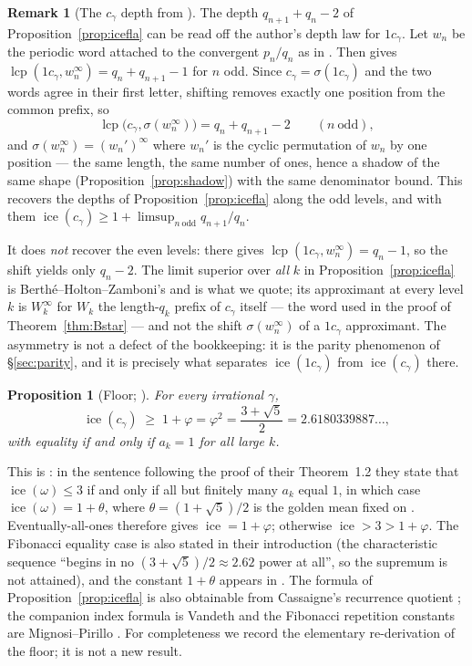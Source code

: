 \documentclass[11pt,reqno]{amsart}
\theoremstyle{plain}
\newtheorem{proposition}[theorem]{Proposition}
\theoremstyle{definition}
\newtheorem{remark}[theorem]{Remark}
\DeclareMathOperator{\lcp}{lcp}
\DeclareMathOperator{\ice}{ice}
\begin{document}
\begin{remark}[The $c_\gamma$ depth from {\cite[Theorem 8.3]{DJirr}}]\label{rem:depthfromP1}
The depth $q_{n+1}+q_n-2$ of Proposition~\ref{prop:icefla} can be read off the author's depth law
for $1c_\gamma$. Let $w_n$ be the periodic word attached to the convergent $p_n/q_n$ as in
\cite[\S8]{DJirr}. Then \cite[Theorem 8.3]{DJirr} gives
$\lcp(1c_\gamma,w_n^{\infty})=q_n+q_{n+1}-1$ for $n$ odd. Since $c_\gamma=\sigma(1c_\gamma)$
and the two words agree in their first letter, shifting removes exactly one position from the common
prefix, so
\[
  \lcp\bigl(c_\gamma,\sigma(w_n^{\infty})\bigr)=q_n+q_{n+1}-2
  \qquad(n\ \text{odd}),
\]
and $\sigma(w_n^{\infty})=(w_n')^{\infty}$ where $w_n'$ is the cyclic permutation of $w_n$ by one
position --- the same length, the same number of ones, hence a shadow of the same shape
(Proposition~\ref{prop:shadow}) with the same denominator bound. This recovers the depths of
Proposition~\ref{prop:icefla} along the odd levels, and with them
$\ice(c_\gamma)\ge1+\limsup_{n\ \mathrm{odd}}q_{n+1}/q_n$.

It does \emph{not} recover the even levels: there \cite[Theorem 8.3]{DJirr} gives
$\lcp(1c_\gamma,w_n^{\infty})=q_n-1$, so the shift yields only $q_n-2$. The limit superior over
\emph{all} $k$ in Proposition~\ref{prop:icefla} is Berth\'e--Holton--Zamboni's and is what we
quote; its approximant at every level $k$ is $W_k^{\infty}$ for $W_k$ the length-$q_k$ prefix of
$c_\gamma$ itself --- the word used in the proof of Theorem~\ref{thm:Bstar} --- and not the shift
$\sigma(w_n^{\infty})$ of a $1c_\gamma$ approximant. The asymmetry is not a defect of the
bookkeeping: it is the parity phenomenon of \S\ref{sec:parity}, and it is precisely what separates
$\ice(1c_\gamma)$ from $\ice(c_\gamma)$ there.
\end{remark}

\begin{proposition}[{Floor; \cite[\S4.2]{BHZ06}}]\label{prop:icefloor}
For every irrational $\gamma$,
\[
  \ice(c_\gamma)\;\ge\;1+\varphi=\varphi^{2}=\frac{3+\sqrt5}{2}=2.6180339887\ldots,
\]
with equality if and only if $a_k=1$ for all large $k$.
\end{proposition}

This is \cite[\S4.2]{BHZ06}: in the sentence following the proof of their Theorem~1.2 they state
that $\ice(\omega)\le3$ if and only if all but finitely many $a_k$ equal $1$, in which case
$\ice(\omega)=1+\theta$, where $\theta=(1+\sqrt5)/2$ is the golden mean fixed on \cite[p.~3]{BHZ06}.
Eventually-all-ones therefore gives $\ice=1+\varphi$; otherwise $\ice>3>1+\varphi$. The Fibonacci
equality case is also stated in their introduction (the characteristic sequence ``begins in no
$(3+\sqrt5)/2\approx2.62$ power at all'', so the supremum is not attained), and the constant
$1+\theta$ appears in \cite[Proposition 2.1(3)]{BHZ06}. The formula of
Proposition~\ref{prop:icefla} is also obtainable from Cassaigne's recurrence quotient
\cite{Cassaigne99}; the companion index formula is Vandeth \cite[Theorem 16]{Vandeth00} and the
Fibonacci repetition constants are Mignosi--Pirillo \cite{MignosiPirillo92}. For completeness we
record the elementary re-derivation of the floor; it is not a new result.
\end{document}
